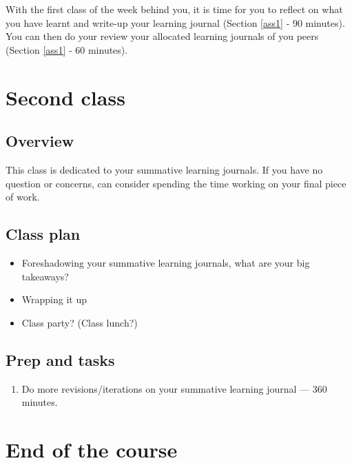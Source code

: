 \documentclass[]{book}
\providecommand{\tightlist}{%
  \setlength{\itemsep}{0pt}\setlength{\parskip}{0pt}}
\theoremstyle{definition}
\theoremstyle{definition}
\theoremstyle{definition}
\theoremstyle{remark}
\begin{document}
With the first class of the week behind you, it is time for you to
reflect on what you have learnt and write-up your learning journal
(Section \ref{ass1} ‐ 90 minutes). You can then do your review your
allocated learning journals of you peers (Section \ref{ass1} ‐ 60
minutes).

\hypertarget{second-class-5}{%
\section*{Second class}\label{second-class-5}}

\hypertarget{overview-11}{%
\subsection*{Overview}\label{overview-11}}

This class is dedicated to your summative learning journals. If you have
no question or concerns, can consider spending the time working on your
final piece of work.

\hypertarget{class-plan-11}{%
\subsection*{Class plan}\label{class-plan-11}}

\begin{itemize}
\item
  Foreshadowing your summative learning journals, what are your big
  takeaways?
\item
  Wrapping it up
\item
  Class party? (Class lunch?)
\end{itemize}

\hypertarget{prep-and-tasks-11}{%
\subsection*{Prep and tasks}\label{prep-and-tasks-11}}

\begin{enumerate}
\def\labelenumi{\arabic{enumi}.}
\tightlist
\item
  Do more revisions/iterations on your summative learning journal ---
  360 minutes.
\end{enumerate}

\hypertarget{end-of-the-course}{%
\section*{End of the course}\label{end-of-the-course}}
\end{document}
